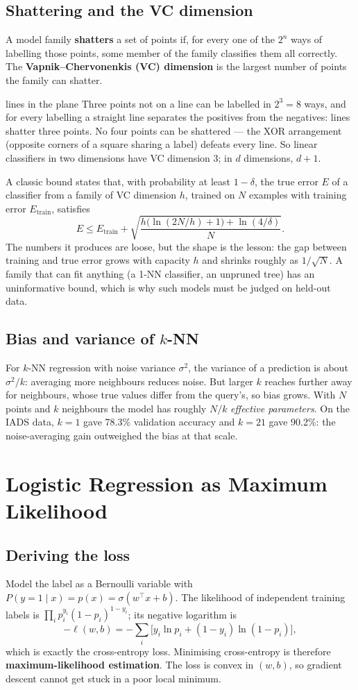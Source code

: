 \documentclass[11pt]{article}
\begin{document}
\subsection{Shattering and the VC dimension}
A model family \textbf{shatters} a set of points if, for every one of the $2^n$ ways of labelling those points, some member of the family classifies them all correctly. The \textbf{Vapnik--Chervonenkis (VC) dimension} is the largest number of points the family can shatter.
\begin{example}{lines in the plane}
Three points not on a line can be labelled in $2^3=8$ ways, and for every labelling a straight line separates the positives from the negatives: lines shatter three points. No four points can be shattered --- the XOR arrangement (opposite corners of a square sharing a label) defeats every line. So linear classifiers in two dimensions have VC dimension 3; in $d$ dimensions, $d+1$.
\end{example}
A classic bound states that, with probability at least $1-\delta$, the true error $E$ of a classifier from a family of VC dimension $h$, trained on $N$ examples with training error $E_{\text{train}}$, satisfies
\[E\le E_{\text{train}}+\sqrt{\frac{h\big(\ln(2N/h)+1\big)+\ln(4/\delta)}{N}}.\]
The numbers it produces are loose, but the shape is the lesson: the gap between training and true error grows with capacity $h$ and shrinks roughly as $1/\sqrt N$. A family that can fit anything (a 1-NN classifier, an unpruned tree) has an uninformative bound, which is why such models must be judged on held-out data.

\subsection{Bias and variance of $k$-NN}
For $k$-NN regression with noise variance $\sigma^2$, the variance of a prediction is about $\sigma^2/k$: averaging more neighbours reduces noise. But larger $k$ reaches further away for neighbours, whose true values differ from the query's, so bias grows. With $N$ points and $k$ neighbours the model has roughly $N/k$ \emph{effective parameters}. On the IADS data, $k=1$ gave 78.3\% validation accuracy and $k=21$ gave 90.2\%: the noise-averaging gain outweighed the bias at that scale.

\section{Logistic Regression as Maximum Likelihood}
\subsection{Deriving the loss}
Model the label as a Bernoulli variable with $P(y=1\mid x)=p(x)=\sigma(w^\top x+b)$. The likelihood of independent training labels is $\prod_ip_i^{y_i}(1-p_i)^{1-y_i}$; its negative logarithm is
\[-\ell(w,b)=-\sum_i\big[y_i\ln p_i+(1-y_i)\ln(1-p_i)\big],\]
which is exactly the cross-entropy loss. Minimising cross-entropy is therefore \textbf{maximum-likelihood estimation}. The loss is convex in $(w,b)$, so gradient descent cannot get stuck in a poor local minimum.
\end{document}
